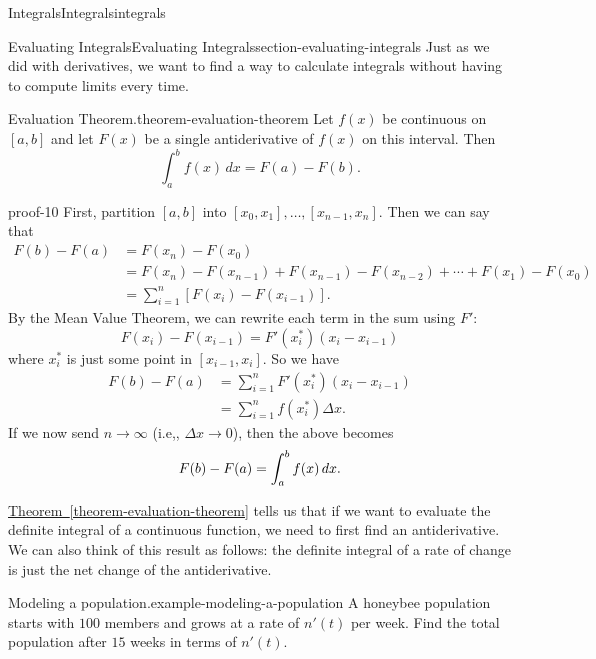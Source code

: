 \documentclass[oneside,10pt,]{book}
\renewcommand{\qedhere}{\relax}
\numberwithin{equation}{section}
\begin{document}
\begin{chapterptx}{Integrals}{}{Integrals}{}{}{integrals}
\begin{sectionptx}{Evaluating Integrals}{}{Evaluating Integrals}{}{}{section-evaluating-integrals}
\hypertarget{p-443}{}%
Just as we did with derivatives, we want to find a way to calculate integrals without having to compute limits every time.%
\begin{theorem}{Evaluation Theorem.}{}{theorem-evaluation-theorem}%
\hypertarget{p-444}{}%
Let \(f(x)\) be continuous on \([a,b]\) and let \(F(x)\) be a single antiderivative of \(f(x)\) on this interval. Then%
\begin{equation*}
\int_{a}^{b}f(x)\,dx = F(a) - F(b).
\end{equation*}
%
\end{theorem}
\begin{proofptx}{}{proof-10}
\hypertarget{p-445}{}%
First, partition \([a,b]\) into \([x_{0},x_{1}],\ldots,[x_{n-1},x_{n}]\). Then we can say that%
\begin{align*}
F(b) - F(a) & = F(x_{n}) - F(x_{0}) \\
& = F(x_{n}) - F(x_{n-1}) + F(x_{n-1}) - F(x_{n-2}) + \cdots + F(x_{1}) - F(x_{0}) \\
& = \sum_{i=1}^{n}[F(x_{i}) - F(x_{i-1})]. 
\end{align*}
By the Mean Value Theorem, we can rewrite each term in the sum using \(F'\):%
\begin{equation*}
F(x_{i}) - F(x_{i-1}) = F'(x_{i}^{*})(x_{i} - x_{i-1})
\end{equation*}
where \(x_{i}^{*}\) is just some point in \([x_{i-1},x_{i}]\). So we have%
\begin{align*}
F(b) - F(a) & = \sum_{i=1}^{n}F'(x_{i}^{*})(x_{i} - x_{i-1}) \\
& = \sum_{i=1}^{n}f(x_{i}^{*})\Delta x. 
\end{align*}
If we now send \(n\to\infty\) (i.e,, \(\Delta x\to 0\)), then the above becomes%
\begin{equation*}
F(b) - F(a) = \int_{a}^{b}f(x)\,dx.\qedhere
\end{equation*}
%
\end{proofptx}
\hypertarget{p-446}{}%
\hyperref[theorem-evaluation-theorem]{Theorem~\ref{theorem-evaluation-theorem}} tells us that if we want to evaluate the definite integral of a continuous function, we need to first find an antiderivative. We can also think of this result as follows: the definite integral of a rate of change is just the net change of the antiderivative.%
\begin{example}{Modeling a population.}{example-modeling-a-population}%
\hypertarget{p-447}{}%
A honeybee population starts with \(100\) members and grows at a rate of \(n'(t)\) per week. Find the total population after \(15\) weeks in terms of \(n'(t)\).%

\end{example}
\end{sectionptx}
\end{chapterptx}
\end{document}
